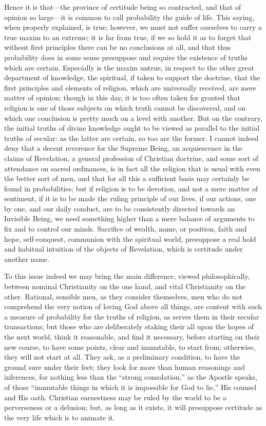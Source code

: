 Hence it is that—the province of certitude being so contracted,
and that of opinion so large—it is common to call probability the
guide of life. This saying, when properly explained, is true; however,
we must not suffer ourselves to carry a true maxim to an extreme; it
is far from true, if we so hold it as to forget that without first
principles there can be no conclusions at all, and that thus
probability does in some sense presuppose and require the existence of
truths which are certain. Especially is the maxim untrue, in respect
to the other great department of knowledge, the spiritual, if taken to
support the doctrine, that the first principles and elements of
religion, which are universally received, are mere matter of opinion;
though in this day, it is too often taken for granted that religion is
one of those subjects on which truth cannot be discovered, and on
which one conclusion is pretty much on a level with another. But on
the contrary, the initial truths of divine knowledge ought to be
viewed as parallel to the initial truths of secular: as the latter are
certain, so too are the former. I cannot indeed deny that a decent
reverence for the Supreme Being, an acquiescence in the claims
of Revelation, a general profession of Christian doctrine, and some
sort of attendance on sacred ordinances, is in fact all the religion
that is usual with even the better sort of men, and that for all this
a sufficient basis may certainly be found in probabilities; but if
religion is to be devotion, and not a mere matter of sentiment, if it
is to be made the ruling principle of our lives, if our actions, one
by one, and our daily conduct, are to be consistently directed towards
an Invisible Being, we need something higher than a mere balance of
arguments to fix and to control our minds. Sacrifice of wealth, name,
or position, faith and hope, self-conquest, communion with the
spiritual world, presuppose a real hold and habitual intuition of the
objects of Revelation, which is certitude under another name.

To this issue indeed we may bring the main difference, viewed
philosophically, between nominal Christianity on the one hand, and
vital Christianity on the other. Rational, sensible men, as they
consider themselves, men who do not comprehend the very notion of
loving God above all things, are content with such a measure of
probability for the truths of religion, as serves them in their
secular transactions; but those who are deliberately staking their all
upon the hopes of the next world, think it reasonable, and find it
necessary, before starting on their new course, to have some points,
clear and immutable, to start from; otherwise, they will not start at
all. They ask, as a preliminary condition, to have the ground sure
under their feet; they look for more than human reasonings and
inferences, for nothing less than the ``strong consolation,''
as the Apostle speaks, of those ``immutable things in which it is
impossible for God to lie,'' His counsel and His oath. Christian
earnestness may be ruled by the world to be a perverseness or a
delusion; but, as long as it exists, it will presuppose certitude as
the very life which is to animate it.


